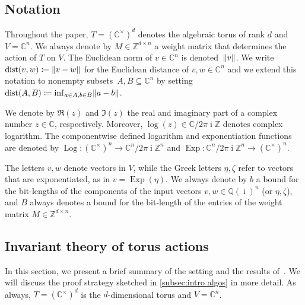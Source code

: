 \documentclass[a4paper,USenglish,cleveref,numberwithinsect]{lipics-v2021}
\DeclareMathOperator{\ii}{i}
\DeclareMathOperator{\Log}{Log}
\DeclareMathOperator{\Exp}{Exp}
\DeclareMathOperator{\dist}{dist}
\newcommand{\QQ}{\mathbb{Q}}
\newcommand{\CC}{\mathbb{C}}
\newcommand{\ZZ}{\mathbb{Z}}
\DeclarePairedDelimiter\norm{\lVert}{\rVert}
\numberwithin{equation}{section}
\begin{document}
\subsection{Notation}
Throughout the paper, $T=(\CC^\times)^d$ denotes the algebraic torus of rank $d$
and $V=\CC^n$. %
We always denote by $M\in\ZZ^{d\times n}$ a weight matrix that determines the action of $T$ on $V$.
The Euclidean norm of $v\in\CC^n$ is denoted~$\norm{v}$.
We write $\dist(v,w) \coloneqq \norm{v-w}$
for the Euclidean distance of $v,w\in\CC^n$
and we extend this notation to nonempty subsets~$A,B\subseteq\CC^n$
by setting~$\dist(A,B) \coloneqq \inf_{a\in A, b\in B} \norm{a-b}$.

We denote by $\Re(z)$ and $\Im(z)$ the real and imaginary part of a complex number $z\in\CC$, respectively.
Moreover,
$\log(z)\in\CC/2\pi\ii\ZZ$ denotes complex logarithm.
The componentwise defined logarithm and exponentiation functions are denoted by $\Log\colon (\CC^\times)^n\rightarrow\CC^n/2\pi\ii\ZZ^n$ and $\Exp:\CC^n/2\pi\ii\ZZ^n\rightarrow (\CC^\times)^n$.

The letters $v,w$ denote vectors in $V$,
while the Greek letters $\eta,\zeta$
refer to vectors that are exponentiated, as in $v=\Exp(\eta)$.
We always denote by $b$ a bound for the bit-lengths of the components
of the input vectors $v,w\in\QQ(\ii)^n$ (or $\eta,\zeta$),
and $B$ always denotes a bound for the bit-length of the entries of the weight matrix $M\in\ZZ^{d\times n}$.



\subsection{Invariant theory of torus actions}\label{se:invar-th-torus}
In this section, we present a brief summary of the setting and the results of~\cite{torus}.
We will discuss the proof strategy sketched in \cref{subsec:intro algos} in more detail.
As always, $T=(\CC^\times)^d$ is the $d$-dimensional torus and $V=\CC^n$.
\end{document}
